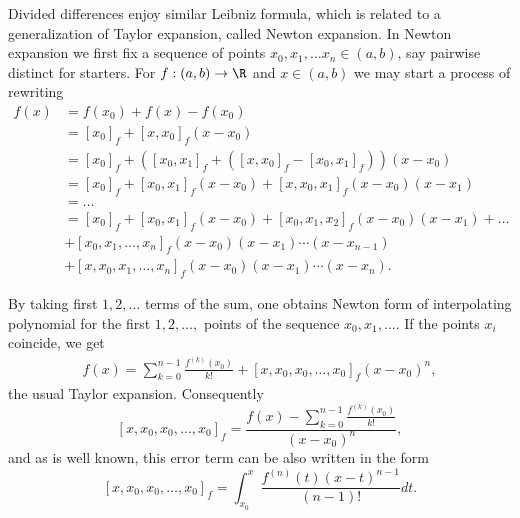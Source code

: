 Divided differences enjoy similar Leibniz formula, which is related to a generalization of Taylor expansion, called Newton expansion. In Newton expansion we first fix a sequence of points $x_{0}, x_{1}, \ldots x_{n} \in (a, b)$, say pairwise distinct for starters. For $f : (a, b) \to \R$ and $x \in (a, b)$ we may start a process of rewriting
\begin{align*}
	f(x) &= f(x_0) + f(x) - f(x_{0}) \\
	&= [x_{0}]_{f} + [x, x_{0}]_{f} (x - x_{0}) \\
	&= [x_{0}]_{f} + ([x_{0}, x_{1}]_{f} + ([x, x_{0}]_{f}- [x_{0}, x_{1}]_{f}))(x - x_{0}) \\
	&= [x_{0}]_{f} + [x_{0}, x_{1}]_{f} (x - x_{0})  + [x, x_{0}, x_{1}]_{f} (x - x_{0}) (x - x_{1}) \\
	&= \ldots \\
	&= [x_{0}]_{f} + [x_{0}, x_{1}]_{f} (x - x_{0})  + [x_{0}, x_{1}, x_{2}]_{f} (x - x_{0}) (x - x_{1}) + \ldots \\
	& + [x_{0}, x_{1}, \ldots, x_{n}]_{f} (x - x_{0}) (x - x_{1}) \cdots (x - x_{n - 1}) \\
	& + [x, x_{0}, x_{1}, \ldots, x_{n}]_{f} (x - x_{0}) (x - x_{1}) \cdots (x - x_{n}).
\end{align*}

By taking first $1, 2, \ldots$ terms of the sum, one obtains Newton form of interpolating polynomial for the first $1, 2, \ldots, $ points of the sequence $x_{0}, x_{1}, \ldots$. If the points $x_{i}$ coincide, we get
\begin{align}\label{taylor_expansion}
	f(x) = \sum_{k = 0}^{n - 1} \frac{f^{(k)}(x_{0})}{k!} + [x, x_{0}, x_{0}, \ldots, x_{0}]_{f} (x - x_{0})^{n},
\end{align}
the usual Taylor expansion. Consequently
\[
	[x, x_{0}, x_{0}, \ldots, x_{0}]_{f} = \frac{f(x) - \sum_{k = 0}^{n - 1} \frac{f^{(k)}(x_{0})}{k!}}{(x - x_{0})^{n}},
\]
and as is well known, this error term can be also written in the form
\[
	[x, x_{0}, x_{0}, \ldots, x_{0}]_{f} = \int_{x_{0}}^{x} \frac{f^{(n)}(t) (x - t)^{n - 1}}{(n - 1)!} dt.
\]

